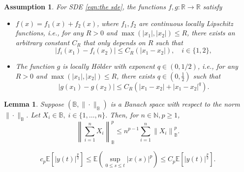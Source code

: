 \documentclass[10pt,a4paper]{amsart}
\newtheorem{assumption}{Assumption}
\newtheorem{lemma}{Lemma}
\begin{document}
\begin{assumption}\label{assump:main}
    For SDE \eqref{eqn:the sde}, the functions $f,g:\mathbb{R}\to \mathbb{R}$ satisfy  
    \begin{itemize}
        \item[(i)] $f(x)=f_1(x)+f_2(x)$, where $f_1,f_2$ are continuous locally Lipschitz functions, i.e.,
        for any $R>0$ and $\max(|x_1|,|x_2|)\leq R$, there exists an arbitrary constant $C_R$ that only depends on $R$ such that
        \begin{equation}
            \left|f_i(x_1)-f_i(x_2)\right|\leq C_R\left(|x_1-x_2|\right), \quad i\in \{1,2\},\label{eqn:f condition}
        \end{equation}
        \item[(ii)] The function $g$ is locally H\"older with exponent $q\in(0,1/2)$, i.e., for any $R>0$ and $\max(|x_1|,|x_2|)\leq R$, there exists $q\in (0,\frac{1}{2})$ such that
        \begin{equation}
            \left|g(x_1)-g(x_2)\right|\leq C_R \left(|x_1-x_2|+|x_1-x_2|^q\right)\label{eqn:g condition}.
        \end{equation}
    \end{itemize}
    
    \end{assumption}

\begin{lemma}\label{lemma:open_p_bracket}
    Suppose $\left(\mathbb{B},\|\cdot\|_{\mathbb{B}}\right)$ is a Banach space with respect to the norm $\|\cdot\|_{\mathbb{B}}$. Let $X_i\in \mathbb{B},\; i\in \{1,\dots,n\}$. Then, for $n\in \mathbb{N},p\geq 1$, 
    \begin{equation}\label{equation:open pth bracket}
        \left\|\sum_{i=1}^n X_i\right\|_{\mathbb{B}}^p \leq n^{p-1} \sum_{i=1}^n\left\|X_i\right\|_{\mathbb{B}}^p.
    \end{equation}
\end{lemma}

    \begin{equation}\label{eqn:BDG inequality}
        c_p \mathbb{E}[|y(t)|^{\frac{p}{2}}] \leq \mathbb{E}\left(\sup _{0 \leq s \leq t}|x(s)|^p\right) \leq C_p \mathbb{E}[|y(t)|^{\frac{p}{2}}].
    \end{equation}
\end{document}

